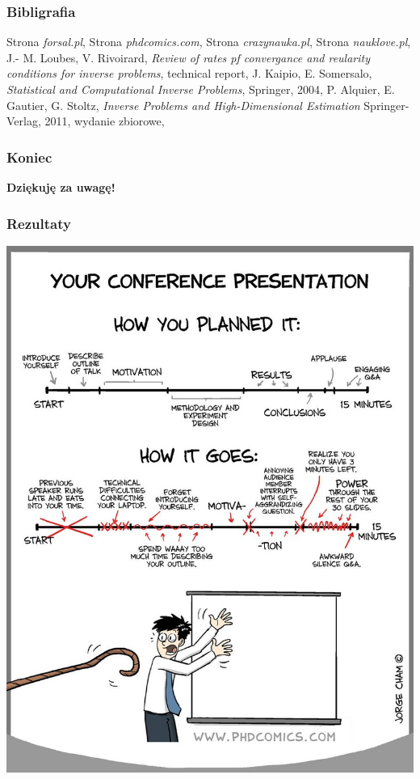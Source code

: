 \documentclass{beamer}
\begin{document}
\begin{frame}\frametitle{Bibligrafia}
\begin{thebibliography}{100}
 Strona \emph{forsal.pl},
 Strona \emph{phdcomics.com},
 Strona \emph{crazynauka.pl},
 Strona \emph{nauklove.pl},
 J.- M. Loubes, V. Rivoirard, \emph{Review of rates pf convergance and reularity conditions for inverse problems}, technical report,
J. Kaipio, E. Somersalo, \emph{Statistical and Computational Inverse Problems}, Springer, 2004,
 P. Alquier,	E. Gautier, G. Stoltz, \emph{Inverse Problems and High-Dimensional Estimation}	Springer-Verlag, 2011, wydanie zbiorowe,
\end{thebibliography}
\end{frame}

\begin{frame}\frametitle{Koniec}
\begin{center}
\huge{\textbf{Dziękuję za uwagę!}}
\end{center}
\end{frame}
\begin{frame}\frametitle{Rezultaty}
\begin{center}
\includegraphics[scale=0.16]{1}
\end{center}
\end{frame}
\end{document}
